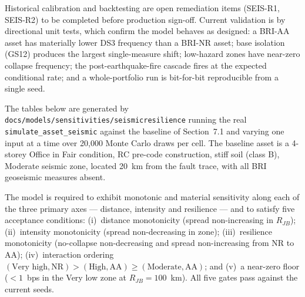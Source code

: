 \documentclass[11pt,a4paper]{article}
\begin{document}
Historical calibration and backtesting are open remediation items (SEIS-R1,
SEIS-R2) to be completed before production sign-off. Current validation is by
directional unit tests, which confirm the model behaves as designed: a BRI-AA
asset has materially lower DS3 frequency than a BRI-NR asset; base isolation
(GS12) produces the largest single-measure shift; low-hazard zones have
near-zero collapse frequency; the post-earthquake-fire cascade fires at the
expected conditional rate; and a whole-portfolio run is bit-for-bit reproducible
from a single seed.

\mkmtestresults

\mkmsensitivity
\label{sec:sensitivity}

The tables below are generated by
\texttt{docs/models/sensitivities/seismicresilience} running the real
\texttt{simulate\_asset\_seismic} against the baseline of Section~7.1 and varying
one input at a time over 20{,}000 Monte Carlo draws per cell. The baseline asset
is a 4-storey Office in Fair condition, RC pre-code construction, stiff soil
(class B), Moderate seismic zone, located 20~km from the fault trace, with all
BRI geoseismic measures absent.

The model is required to exhibit monotonic and material sensitivity along each of
the three primary axes --- distance, intensity and resilience --- and to satisfy
five acceptance conditions: (i)~distance monotonicity (spread non-increasing in
$R_{JB}$); (ii)~intensity monotonicity (spread non-decreasing in zone);
(iii)~resilience monotonicity (no-collapse non-decreasing and spread
non-increasing from NR to AA); (iv)~interaction ordering
$(\text{Very high}, \text{NR}) > (\text{High}, \text{AA}) \ge (\text{Moderate},
\text{AA})$; and (v)~a near-zero floor ($< 1$~bps in the Very low zone at
$R_{JB} = 100$~km). All five gates pass against the current seeds.



\mkmlimitations
\end{document}
